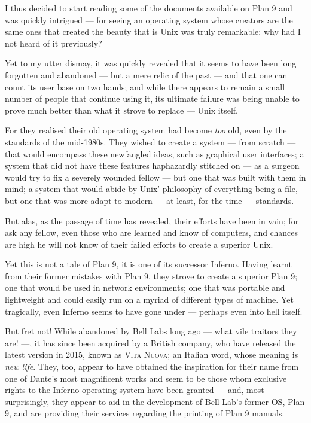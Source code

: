 \documentclass[a5paper,twoside,12pt]{report}
\begin{document}
I thus decided to start reading some of the documents available on Plan 9 and was quickly intrigued — for seeing an operating system whose creators are the same ones that created the beauty that is Unix was truly remarkable; why had I not heard of it previously?

Yet to my utter dismay, it was quickly revealed that it seems to have been long forgotten and abandoned — but a mere relic of the past — and that one can count its user base on two hands; and while there appears to remain a small number of people that continue using it, its ultimate failure was being unable to prove much better than what it strove to replace — Unix itself.

For they realised their old operating system had become \textit{too} old, even by the standards of the mid-1980s. They wished to create a system — from scratch — that would encompass these newfangled ideas, such as graphical user interfaces; a system that did not have these features haphazardly stitched on — as a surgeon would try to fix a severely wounded fellow — but one that was built with them in mind; a system that would abide by Unix' philosophy of everything being a file, but one that was more adapt to modern — at least, for the time — standards.

But alas, as the passage of time has revealed, their efforts have been in vain; for ask any fellow, even those who are learned and know of computers, and chances are high he will not know of their failed efforts to create a superior Unix.

Yet this is not a tale of Plan 9, it is one of its successor Inferno. Having learnt from their former mistakes with Plan 9, they strove to create a superior Plan 9; one that would be used in network environments; one that was portable and lightweight and could easily run on a myriad of different types of machine.
Yet tragically, even Inferno seems to have gone under — perhaps even into hell itself.

But fret not! While abandoned by Bell Labs long ago — what vile traitors they are! —, it has since been acquired by a British company, who have released the latest version in 2015, known as \textsc{Vita Nuova}; an Italian word, whose meaning is \textit{new life}. They, too, appear to have obtained the inspiration for their name from one of Dante's most magnificent works and seem to be those whom exclusive rights to the Inferno operating system have been granted — and, most surprisingly, they appear to aid in the development of Bell Lab's former OS, Plan 9, and are providing their services regarding the printing of Plan 9 manuals.
\end{document}
